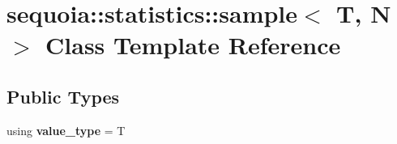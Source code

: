 \hypertarget{classsequoia_1_1statistics_1_1sample}{}\section{sequoia\+::statistics\+::sample$<$ T, N $>$ Class Template Reference}
\label{classsequoia_1_1statistics_1_1sample}
\subsection*{Public Types}
\begin{DoxyCompactItemize}
\item 
\mbox{\label{classsequoia_1_1statistics_1_1sample_ac03400863dc0207cb8f7315d6ec66a3f}} 
using {\bfseries value\+\_\+type} = T
\end{DoxyCompactItemize}
